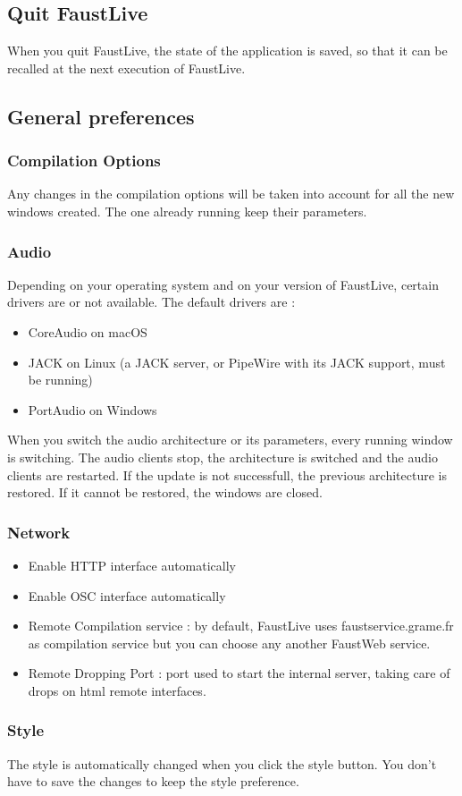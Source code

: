 \documentclass[a4paper]{article}
\begin{document}
\subsection{Quit FaustLive}

When you quit FaustLive, the state of the application is saved, so that it can be recalled at the next execution of FaustLive.

\subsection{General preferences}
\subsubsection{Compilation Options}
Any changes in the compilation options will be taken into account for all the new windows created. The one already running keep their parameters.
\subsubsection{Audio}
 
Depending on your operating system and on your version of FaustLive, certain drivers are or not available.
The default drivers are :
\begin{itemize}
\item CoreAudio on macOS
\item JACK on Linux (a JACK server, or PipeWire with its JACK support, must be running)
\item PortAudio on Windows
\end{itemize}

When you switch the audio architecture or its parameters, every running window is switching. The audio clients stop, the architecture is switched and the audio clients are restarted. If the update is not successfull, the previous architecture is restored. If it cannot be restored, the windows are closed. 

\subsubsection{Network}
\begin{itemize}
\item Enable HTTP interface automatically
\item Enable OSC interface automatically
\item Remote Compilation service : by default, FaustLive uses faustservice.grame.fr as compilation service but you can choose any another FaustWeb service.
\item Remote Dropping Port : port used to start the internal server, taking care of drops on html remote interfaces.

\end{itemize}

\subsubsection{Style}
The style is automatically changed when you click the style button. You don't have to save the changes to keep the style preference. 

%
\end{document}
